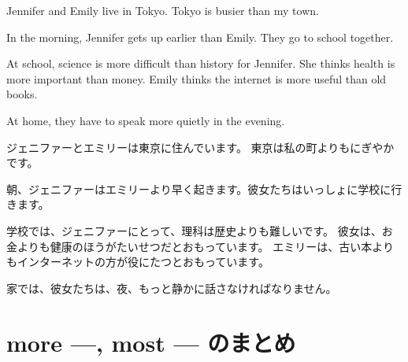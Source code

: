 \documentclass[aspectratio=169,xcolor={dvipsnames,table}]{beamer}
\begin{document}
\begin{frame}
\end{frame}
\begin{frame}[plain]

\begin{tcolorbox}[
before upper={\setlength{\parindent}{1.25em}}
]
Jennifer and Emily live in Tokyo.
Tokyo is busier than my town.

In the morning, Jennifer gets up earlier than Emily.
They go to school together.

At school, science is more difficult than history for Jennifer.
She thinks health is more important than money.
Emily thinks the internet is more useful than old books.

At home, they have to speak more quietly in the evening.
\end{tcolorbox}

\small
\setlength{\parindent}{1\zw}
ジェニファーとエミリーは東京に住んでいます。
東京は私の町よりもにぎやかです。

朝、ジェニファーはエミリーより早く起きます。彼女たちはいっしょに学校に行きます。

学校では、ジェニファーにとって、理科は歴史よりも難しいです。
彼女は、お金よりも健康のほうがたいせつだとおもっています。
エミリーは、古い本よりもインターネットの方が役にたつとおもっています。
 
家では、彼女たちは、夜、もっと静かに話さなければなりません。
\end{frame}
\section{more ---, most --- のまとめ}
\end{document}
